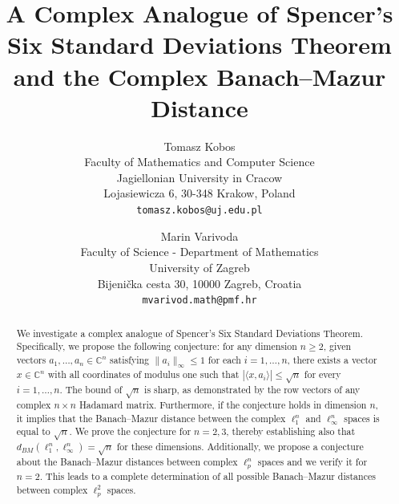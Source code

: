 \documentclass[12pt, a4paper]{article}
\theoremstyle{plain} %
\theoremstyle{definition} %
\theoremstyle{remark} %
\begin{document}
\title{A Complex Analogue of Spencer's Six Standard Deviations Theorem and the Complex Banach--Mazur Distance}

\author{Tomasz Kobos\\
Faculty of Mathematics and Computer Science\\
Jagiellonian University in Cracow\\
\small Lojasiewicza 6, 30-348 Krakow, Poland\\
\small\texttt{tomasz.kobos@uj.edu.pl}\\
\and 
Marin Varivoda\\
Faculty of Science - Department of Mathematics\\ 
University of Zagreb\\ 
\small Bijenička cesta 30, 10000 Zagreb, Croatia\\
\small {\texttt{mvarivod.math@pmf.hr}}
}




\maketitle

\begin{abstract}

We investigate a complex analogue of Spencer's Six Standard Deviations Theorem. Specifically, we propose the following conjecture: for any dimension $n \geq 2$, given vectors $a_1, \ldots, a_n \in \mathbb{C}^n$ satisfying $\|a_i\|_{\infty} \leq 1$ for each $i=1, \ldots, n$, there exists a vector $x \in \mathbb{C}^n$ with all coordinates of modulus one such that $|\langle x, a_i \rangle| \leq \sqrt{n}$ for every $i=1, \ldots, n$. The bound of $\sqrt{n}$ is sharp, as demonstrated by the row vectors of any complex $n \times n$ Hadamard matrix. Furthermore, if the conjecture holds in dimension $n$, it implies that the Banach--Mazur distance between the complex $\ell_1^n$ and $\ell_{\infty}^n$ spaces is equal to $\sqrt{n}$. We prove the conjecture for $n =2, 3$, thereby establishing also that $d_{BM}(\ell_1^n, \ell_{\infty}^n) = \sqrt{n}$ for these dimensions. Additionally, we propose a conjecture about the Banach--Mazur distances between complex $\ell_p^n$ spaces and we verify it for $n=2$. This leads to a complete determination of all possible Banach--Mazur distances between complex $\ell_p^2$ spaces.
\end{abstract}
\end{document}
